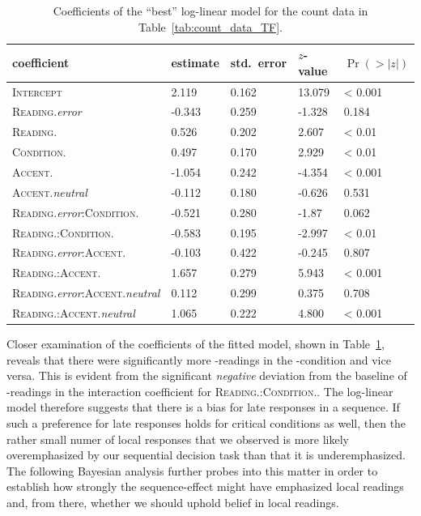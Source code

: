 \documentclass[fleqn,reqno,10pt,draft]{article}
\newcommand{\lc}{\acro{lc}}
\newcommand{\ec}{\acro{ec}}
\begin{document}
\begin{table}
  \centering
  \begin{tabular}{lllll}
    coefficient & estimate & std.~error & $z$-value & $\Pr(>|z|)$ \\
    \midrule
    \textsc{Intercept} & 2.119  &   0.162 & 13.079   & < 0.001 \\
    \textsc{Reading}.\emph{error} & -0.343 &  0.259 & -1.328 &  0.184
    \\
    \textsc{Reading}.\lc & 0.526 &  0.202 & 2.607 & < 0.01 \\
    \textsc{Condition}.\lc & 0.497 &  0.170  & 2.929 & < 0.01 \\
    \textsc{Accent}.\lc & -1.054 & 0.242 & -4.354 & < 0.001 \\
    \textsc{Accent}.\emph{neutral} & -0.112 & 0.180 &  -0.626 &  0.531
    \\
    \textsc{Reading}.\emph{error}:\textsc{Condition}.\lc & -0.521 &
    0.280 & -1.87 & 0.062 \\
    \textsc{Reading}.\lc:\textsc{Condition}.\lc & -0.583 & 0.195 &
    -2.997 &  < 0.01 \\
    \textsc{Reading}.\emph{error}:\textsc{Accent}.\lc & -0.103 &
    0.422 &  -0.245 & 0.807  \\
    \textsc{Reading}.\lc:\textsc{Accent}.\lc & 1.657 &  0.279 & 5.943
    & < 0.001 \\
    \textsc{Reading}.\emph{error}:\textsc{Accent}.\emph{neutral} & 0.112 &
    0.299  &  0.375 &  0.708 \\
    \textsc{Reading}.\lc:\textsc{Accent}.\emph{neutral} & 1.065  &
    0.222 &  4.800 & < 0.001 \\
  \end{tabular}
  \caption{Coefficients of the ``best'' log-linear model for the count
    data in Table~\ref{tab:count_data_TF}.}
  \label{tab:Coefficients-TF}
\end{table}

Closer examination of the coefficients of the fitted model, shown in
Table~\ref{tab:Coefficients-TF}, reveals that there were significantly
more \ec-readings in the \lc-condition and vice versa. This is evident
from the significant \emph{negative} deviation from the baseline of
\ec-readings in the interaction coefficient for
\textsc{Reading}.\lc:\textsc{Condition}.\lc. The log-linear model
therefore suggests that there is a bias for late responses in a
sequence. If such a preference for late responses holds for critical
conditions as well, then the rather small numer of local responses
that we observed is more likely overemphasized by our sequential
decision task than that it is underemphasized. The following Bayesian
analysis further probes into this matter in order to establish how
strongly the sequence-effect might have emphasized local readings and,
from there, whether we should uphold belief in local readings.
\end{document}

